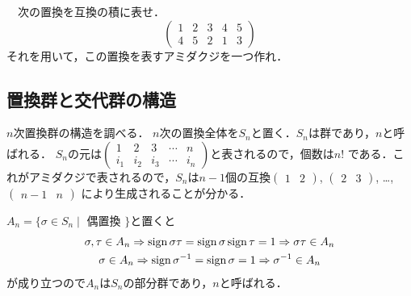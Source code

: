 \begin{Quiz}
　次の置換を互換の積に表せ．
   \[
        \begin{pmatrix}
             1&2&3&4&5\\
             4&5&2&1&3
        \end{pmatrix}
   \]
   それを用いて，この置換を表すアミダクジを一つ作れ．
\end{Quiz}

\subsection{置換群と交代群の構造}
$n$次置換群の構造を調べる．
$n$次の置換全体を$S_n$と置く．$S_n$は群であり，$n$と呼ばれる．
$S_n$の元は$\begin{pmatrix}1&2&3&\cdots&n\\i_1&i_2&i_3&\cdots&i_n\end{pmatrix}$と表されるので，個数は$n!$ である．これがアミダクジで表されるので，$S_n$は$n-1$個の互換$\begin{pmatrix}1&2\end{pmatrix}$, $\begin{pmatrix}2&3\end{pmatrix}$, \dots, $\begin{pmatrix}n-1&n\end{pmatrix}$
により生成されることが分かる．

$A_n=\{\sigma\in S_n\mid$ 偶置換 $\}$と置くと
 \begin{gather*}
      \sigma,\tau\in A_n
     \Rightarrow
     \operatorname{sign} \sigma\tau=\operatorname{sign} \sigma  \operatorname{sign}\tau=1
     \Rightarrow
      \sigma\tau\in A_n
     \\
       \sigma\in A_n
     \Rightarrow 
     \operatorname{sign} \sigma^{-1}=\operatorname{sign} \sigma=1
     \Rightarrow
     \sigma^{-1}\in A_n
 \end{gather*}
 が成り立つので$A_n$は$S_n$の{部分群}であり，$n$と呼ばれる．
 \emptyline

